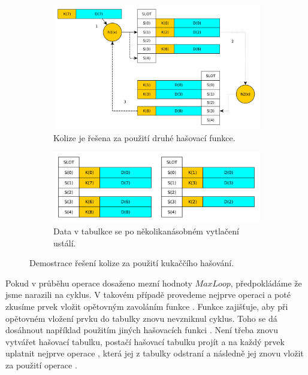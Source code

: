 \begin{figure}
	\centering
	\begin{subfigure}[b]{0.53\textwidth}
		\includegraphics[width=\textwidth]{fig/cuckoo_hashing_insert}
		\caption{Kolize je řešena za použití druhé hašovací funkce.}
	\end{subfigure}
	\begin{subfigure}[b]{0.46\textwidth}
		\includegraphics[width=\textwidth]{fig/cuckoo_hashing_insert_result}
		\caption{Data v tabulkce se po několikanásobném vytlačení ustálí.}
	\end{subfigure}
	\caption{Demostrace řešení kolize za použití kukaččího hašování.}
	\label{fig:cuckoo_hashing}
\end{figure}

Pokud v průběhu operace dosaženo mezní hodnoty $MaxLoop$, předpokládáme že jsme narazili na cyklus. V takovém případě 
provedeme nejprve operaci  a poté zkusíme prvek vložit opětovným zavoláním funkce .
Funkce  zajišťuje, aby při opětovném vložení prvku do tabulky znovu nevzniknul cyklus. Toho se dá
dosáhnout například použitím jiných hašovacích funkci \cite{Cuckoo_hashing}. Není třeba znovu vytvářet hašovací tabulku,
postačí hašovací tabulku projít a na každý prvek uplatnit nejprve operace , která jej z tabulky odstraní 
a následně jej znovu vložit za použití operace .

